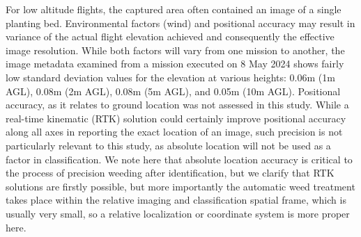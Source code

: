 \documentclass[letterpaper, notitlepage]{report}
\begin{document}
%
For low altitude flights, the captured area often contained an image of a single planting bed. Environmental factors (wind) and positional accuracy may result in variance of the actual flight elevation achieved and consequently the effective image resolution. While both factors will vary from one mission to another, the image metadata examined from a mission executed on 8 May 2024 shows fairly low standard deviation values for the elevation  at various heights: 0.06m (1m AGL), 0.08m (2m AGL), 0.08m (5m AGL), and 0.05m (10m AGL). Positional accuracy, as it relates to ground location was not assessed in this study. While a real-time kinematic (RTK) solution could certainly improve positional accuracy along all axes in reporting the exact location of an image, such precision is not particularly relevant to this study, as absolute location will not be used as a factor in classification. We note here that absolute location accuracy is critical to the process of precision weeding after identification, but we clarify that RTK solutions are firstly possible, but more importantly the automatic weed treatment takes place within the relative imaging and classification spatial frame, which is usually very small, so a relative localization or coordinate system is more proper here.
\end{document}

